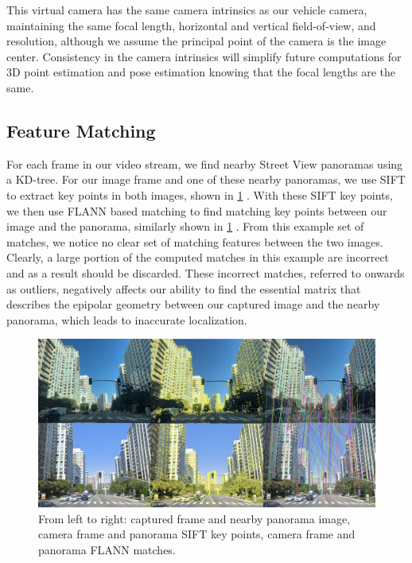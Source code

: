 \documentclass[conference]{IEEEtran}
\begin{document}
This virtual camera has the same camera intrinsics as our vehicle camera, maintaining the same focal length, horizontal and vertical field-of-view, and resolution, although we assume the principal point of the camera is the image center. Consistency in the camera intrinsics will simplify future computations for 3D point estimation and pose estimation knowing that the focal lengths are the same. 



\subsection{Feature Matching}
For each frame in our video stream, we find nearby Street View panoramas using a KD-tree. For our image frame and one of these nearby panoramas, we use SIFT to extract key points in both images, shown in \ref{sift_flann} \cite{sift}. With these SIFT key points, we then use FLANN based matching to find matching key points between our image and the panorama, similarly shown in \ref{sift_flann} \cite{flann}. From this example set of matches, we notice no clear set of matching features between the two images.  Clearly, a large portion of the computed matches in this example are incorrect and as a result should be discarded. These incorrect matches, referred to onwards as outliers, negatively affects our ability to find the essential matrix that describes the epipolar geometry between our captured image and the nearby panorama, which leads to inaccurate localization.

\begin{figure}[htb]
\centerline{\includegraphics[scale=0.2]{Images/fig_features.jpg}}
\caption{From left to right: captured frame and nearby panorama image, camera frame and panorama SIFT key points, camera frame and panorama FLANN matches.}
\label{sift_flann}
\end{figure}
\end{document}

